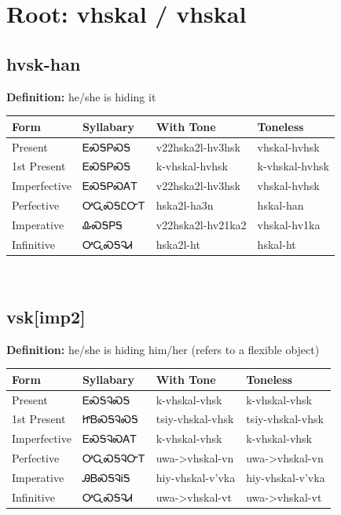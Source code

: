 \documentclass{article}%
\begin{document}
%
\normalsize%
\section*{Root: vhskal / vhskal}%
\subsection*{hvsk-han}%
\textbf{Definition: }%
he/she is hiding it%
\\[0.5em]%
\begin{tabular}{|l|l|l|l|}%
\hline%
\textbf{Form}&\textbf{Syllabary}&\textbf{With Tone}&\textbf{Toneless}\\%
\hline%
Present&ᎬᏍᎦᏢᏍᎦ&v22hska2l{-}hv3hsk&vhskal{-}hvhsk\\%
1st Present&ᎬᏍᎦᏢᏍᎦ&k{-}vhskal{-}hvhsk&k{-}vhskal{-}hvhsk\\%
Imperfective&ᎬᏍᎦᏢᏍᎪᎢ&v22hska2l{-}hv3hsk&vhskal{-}hvhsk\\%
Perfective&ᎤᏩᏍᎦᏝᏅᎢ&hska2l{-}ha3n&hskal{-}han\\%
Imperative&ᎲᏍᎦᏢᎦ&v22hska2l{-}hv21ka2&vhskal{-}hv1ka\\%
Infinitive&ᎤᏩᏍᎦᎸᏗ&hska2l{-}ht&hskal{-}ht\\%
\hline%
\end{tabular}%
\\[1em]%
\subsection*{vsk[imp2]}%
\textbf{Definition: }%
he/she is hiding him/her (refers to a flexible object)%
\\[0.5em]%
\begin{tabular}{|l|l|l|l|}%
\hline%
\textbf{Form}&\textbf{Syllabary}&\textbf{With Tone}&\textbf{Toneless}\\%
\hline%
Present&ᎬᏍᎦᎸᏍᎦ&k{-}vhskal{-}vhsk&k{-}vhskal{-}vhsk\\%
1st Present&ᏥᏴᏍᎦᎸᏍᎦ&tsiy{-}vhskal{-}vhsk&tsiy{-}vhskal{-}vhsk\\%
Imperfective&ᎬᏍᎦᎸᏍᎪᎢ&k{-}vhskal{-}vhsk&k{-}vhskal{-}vhsk\\%
Perfective&ᎤᏩᏍᎦᎸᏅᎢ&uwa{-}>vhskal{-}vn&uwa{-}>vhskal{-}vn\\%
Imperative&ᎯᏴᏍᎦᎸᎥᎦ&hiy{-}vhskal{-}v'vka&hiy{-}vhskal{-}v'vka\\%
Infinitive&ᎤᏩᏍᎦᎸᏗ&uwa{-}>vhskal{-}vt&uwa{-}>vhskal{-}vt\\%
\hline%
\end{tabular}%
\\[1em]%
\end{document}
